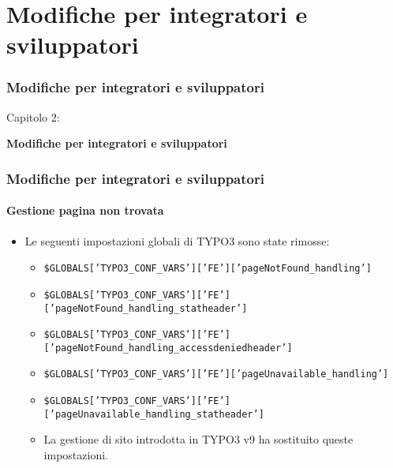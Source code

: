 %

\section{Modifiche per integratori e sviluppatori}
\begin{frame}[fragile]
	\frametitle{Modifiche per integratori e sviluppatori}

	\begin{center}\huge{Capitolo 2:}\end{center}
	\begin{center}\huge{\color{typo3darkgrey}\textbf{Modifiche per integratori e sviluppatori}}\end{center}

\end{frame}


\begin{frame}[fragile]
	\frametitle{Modifiche per integratori e sviluppatori}
	\framesubtitle{Gestione pagina non trovata}

	\begin{itemize}

		\item Le seguenti impostazioni globali di TYPO3 sono state rimosse:

			\begin{itemize}
				\item {\fontsize{7}{8}\selectfont\texttt{\$GLOBALS['TYPO3\_CONF\_VARS']['FE']['pageNotFound\_handling']}}
				\item {\fontsize{7}{8}\selectfont\texttt{\$GLOBALS['TYPO3\_CONF\_VARS']['FE']['pageNotFound\_handling\_statheader']}}
				\item {\fontsize{7}{8}\selectfont\texttt{\$GLOBALS['TYPO3\_CONF\_VARS']['FE']['pageNotFound\_handling\_accessdeniedheader']}}
				\item {\fontsize{7}{8}\selectfont\texttt{\$GLOBALS['TYPO3\_CONF\_VARS']['FE']['pageUnavailable\_handling']}}
				\item {\fontsize{7}{8}\selectfont\texttt{\$GLOBALS['TYPO3\_CONF\_VARS']['FE']['pageUnavailable\_handling\_statheader']}}
			\end{itemize}

			\begin{itemize}\smaller
				\item[\ding{228}] La gestione di sito introdotta in TYPO3 v9 ha sostituito queste impostazioni.
			\end{itemize}\normalsize

	\end{itemize}

\end{frame}

